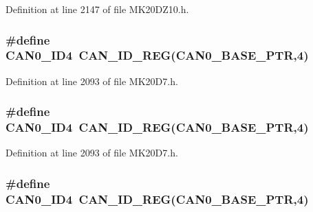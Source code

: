 Definition at line 2147 of file M\+K20\+D\+Z10.\+h.

\subsubsection[{\texorpdfstring{C\+A\+N0\+\_\+\+I\+D4}{CAN0_ID4}}]{\setlength{\rightskip}{0pt plus 5cm}\#define C\+A\+N0\+\_\+\+I\+D4~{\bf C\+A\+N\+\_\+\+I\+D\+\_\+\+R\+EG}({\bf C\+A\+N0\+\_\+\+B\+A\+S\+E\+\_\+\+P\+TR},4)}\hypertarget{group___c_a_n___register___accessor___macros_ga4089afbedcbf3eef2c657f1b8f005c9a}{}\label{group___c_a_n___register___accessor___macros_ga4089afbedcbf3eef2c657f1b8f005c9a}


Definition at line 2093 of file M\+K20\+D7.\+h.

\subsubsection[{\texorpdfstring{C\+A\+N0\+\_\+\+I\+D4}{CAN0_ID4}}]{\setlength{\rightskip}{0pt plus 5cm}\#define C\+A\+N0\+\_\+\+I\+D4~{\bf C\+A\+N\+\_\+\+I\+D\+\_\+\+R\+EG}({\bf C\+A\+N0\+\_\+\+B\+A\+S\+E\+\_\+\+P\+TR},4)}\hypertarget{group___c_a_n___register___accessor___macros_ga4089afbedcbf3eef2c657f1b8f005c9a}{}\label{group___c_a_n___register___accessor___macros_ga4089afbedcbf3eef2c657f1b8f005c9a}


Definition at line 2093 of file M\+K20\+D7.\+h.

\subsubsection[{\texorpdfstring{C\+A\+N0\+\_\+\+I\+D4}{CAN0_ID4}}]{\setlength{\rightskip}{0pt plus 5cm}\#define C\+A\+N0\+\_\+\+I\+D4~{\bf C\+A\+N\+\_\+\+I\+D\+\_\+\+R\+EG}({\bf C\+A\+N0\+\_\+\+B\+A\+S\+E\+\_\+\+P\+TR},4)}\hypertarget{group___c_a_n___register___accessor___macros_ga4089afbedcbf3eef2c657f1b8f005c9a}{}\label{group___c_a_n___register___accessor___macros_ga4089afbedcbf3eef2c657f1b8f005c9a}


